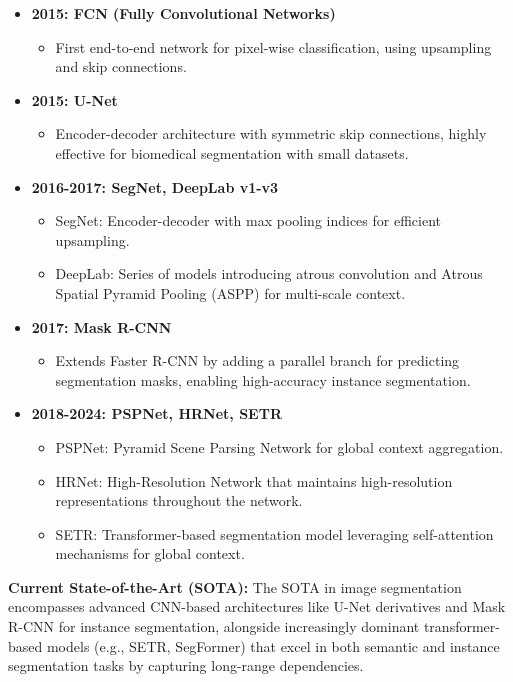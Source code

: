 \documentclass{article}
\begin{document}
\begin{itemize}[leftmargin=1.5em]
 \item \textbf{2015: FCN (Fully Convolutional Networks)} 
  \begin{itemize}
    \item First end-to-end network for pixel-wise classification, using upsampling and skip connections.
  \end{itemize}
 \item \textbf{2015: U-Net} 
  \begin{itemize}
    \item Encoder-decoder architecture with symmetric skip connections, highly effective for biomedical segmentation with small datasets.
  \end{itemize}
 \item \textbf{2016-2017: SegNet, DeepLab v1-v3}  
  \begin{itemize}
    \item SegNet: Encoder-decoder with max pooling indices for efficient upsampling.
    \item DeepLab: Series of models introducing atrous convolution and Atrous Spatial Pyramid Pooling (ASPP) for multi-scale context.
  \end{itemize}
 \item \textbf{2017: Mask R-CNN} 
  \begin{itemize}
    \item Extends Faster R-CNN by adding a parallel branch for predicting segmentation masks, enabling high-accuracy instance segmentation.
  \end{itemize}
 \item \textbf{2018-2024: PSPNet, HRNet, SETR}
  \begin{itemize}
    \item PSPNet: Pyramid Scene Parsing Network for global context aggregation.
    \item HRNet: High-Resolution Network that maintains high-resolution representations throughout the network.
    \item SETR: Transformer-based segmentation model leveraging self-attention mechanisms for global context.
  \end{itemize}
\end{itemize}
\textbf{Current State-of-the-Art (SOTA):} The SOTA in image segmentation encompasses advanced CNN-based architectures like U-Net derivatives and Mask R-CNN for instance segmentation, alongside increasingly dominant transformer-based models (e.g., SETR, SegFormer) that excel in both semantic and instance segmentation tasks by capturing long-range dependencies.
\end{document}
